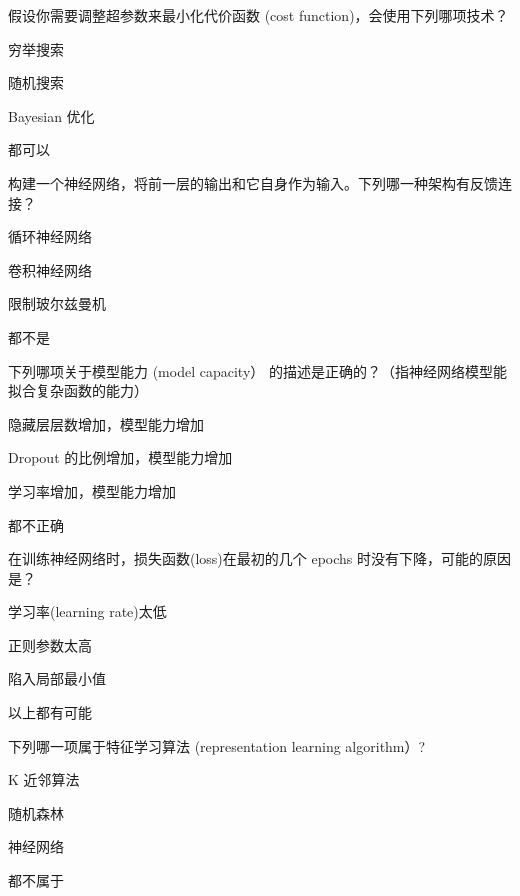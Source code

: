 \documentclass{exam-zh}
\begin{document}
\begin{question}
	假设你需要调整超参数来最小化代价函数 (cost function)，会使用下列哪项技术？\paren[D]
	\begin{choices}
		\item 穷举搜索
		\item 随机搜索
		\item Bayesian 优化
		\item 都可以
	\end{choices}
\end{question}

\begin{question}
	构建一个神经网络，将前一层的输出和它自身作为输入。下列哪一种架构有反馈连接？\paren[A]
	\begin{choices}
		\item 循环神经网络
		\item 卷积神经网络
		\item 限制玻尔兹曼机
		\item 都不是
	\end{choices}
\end{question}

\begin{question}
	下列哪项关于模型能力 (model capacity） 的描述是正确的？（指神经网络模型能拟合复杂函数的能力）\paren[A]
	\begin{choices}
		\item 隐藏层层数增加，模型能力增加
		\item Dropout 的比例增加，模型能力增加
		\item 学习率增加，模型能力增加
		\item 都不正确
	\end{choices}
\end{question}

\begin{question}
	在训练神经网络时，损失函数(loss)在最初的几个 epochs 时没有下降，可能的原因是？\paren[D]
	\begin{choices}
		\item 学习率(learning rate)太低
		\item 正则参数太高
		\item 陷入局部最小值
		\item 以上都有可能
	\end{choices}
\end{question}

\begin{question}
	下列哪一项属于特征学习算法 (representation learning algorithm）?\paren[C]
	\begin{choices}
		\item K 近邻算法
		\item 随机森林
		\item 神经网络
		\item 都不属于
	\end{choices}
\end{question}
\end{document}
